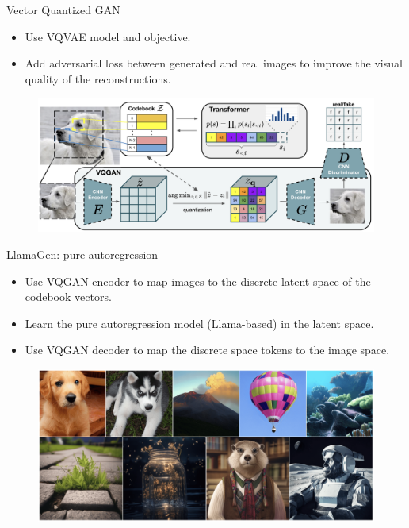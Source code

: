 \begin{frame}{Vector Quantized GAN}
	\begin{itemize}
		\item Use VQVAE model and objective.
		\item Add adversarial loss between generated and real images to improve the visual quality of the reconstructions.
	\end{itemize}
	\begin{figure}
		\includegraphics[width=\linewidth]{figs/vqgan}
	\end{figure}
	
\end{frame}
\begin{frame}{LlamaGen: pure autoregression}
	\begin{itemize}
		\item Use VQGAN encoder to map images to the discrete latent space of the codebook vectors.
		\item Learn the pure autoregression model (Llama-based) in the latent space.
		\item Use VQGAN decoder to map the discrete space tokens to the image space.
	\end{itemize}
	\begin{figure}
		\includegraphics[width=0.9\linewidth]{figs/llamagen_samples}
	\end{figure}
	
\end{frame}
